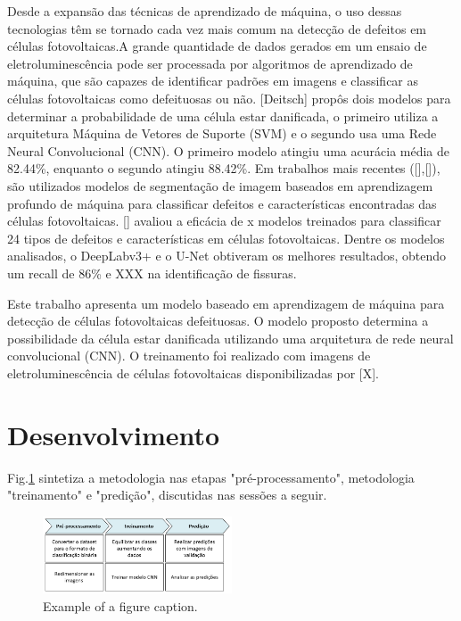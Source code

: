 \documentclass[conference]{IEEEtran}
\begin{document}
Desde a expansão das técnicas de aprendizado de máquina, o uso dessas
tecnologias têm se tornado cada vez mais comum na detecção de defeitos em
células fotovoltaicas.A grande quantidade de dados gerados em um ensaio de
eletroluminescência pode ser processada por algoritmos de aprendizado de
máquina, que são capazes de identificar padrões em imagens e classificar as
células fotovoltaicas como defeituosas ou não. [Deitsch] propôs dois modelos
para determinar a probabilidade de uma célula estar danificada, o primeiro
utiliza a arquitetura
Máquina de Vetores de Suporte (SVM) e o segundo usa uma Rede Neural
Convolucional (CNN). O primeiro modelo atingiu uma acurácia média de 82.44\%,
enquanto o segundo atingiu 88.42\%. Em trabalhos mais recentes ([],[]), são
utilizados modelos de segmentação de imagem baseados em aprendizagem profundo
de máquina para classificar defeitos e características encontradas das células
fotovoltaicas. [] avaliou a eficácia de x modelos treinados para classificar
24 tipos de defeitos e características em células fotovoltaicas.
Dentre os modelos analisados, o DeepLabv3+ e o U-Net obtiveram os melhores
resultados, obtendo um recall de 86\% e XXX na identificação de fissuras.

Este trabalho apresenta um modelo baseado em aprendizagem de máquina para
detecção de células fotovoltaicas defeituosas. O modelo proposto determina a
possibilidade da célula estar danificada utilizando uma arquitetura de rede
neural convolucional (CNN). O treinamento foi realizado com imagens de
eletroluminescência de células fotovoltaicas disponibilizadas por [X].

\section{Desenvolvimento}

Fig.\ref{fig:metodologia} sintetiza a metodologia nas etapas
"pré-processamento", metodologia
"treinamento" e "predição", discutidas nas sessões a seguir.
\begin{figure}[htbp]
    \centerline{\includegraphics[width=0.5\textwidth]{images/metodologia.png}}
    \caption{Example of a figure caption.}
    \label{fig:metodologia}
\end{figure}
\end{document}
